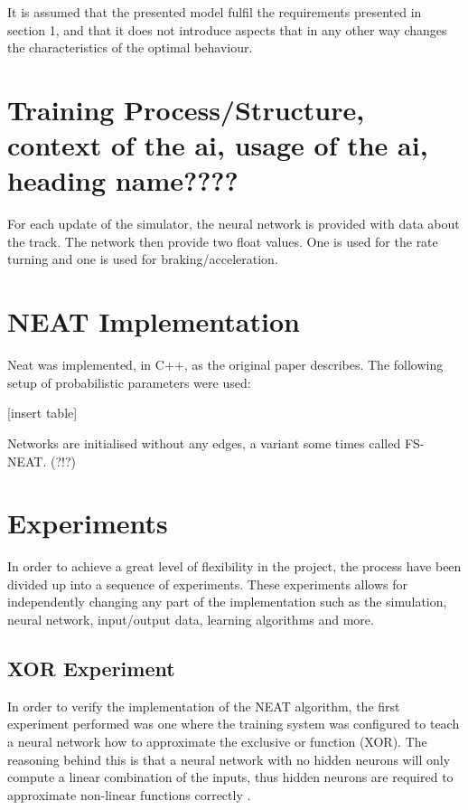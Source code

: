 It is assumed that the presented model fulfil the requirements presented in section 1, and that it does not introduce aspects that in any other way changes the characteristics of the optimal behaviour.

\section{Training Process/Structure, context of the ai, usage of the ai, heading name????}

For each update of the simulator, the neural network is provided with data about the track. The network then provide two float values. One is used for the rate turning and one is used for braking/acceleration.


\section{NEAT Implementation}

Neat was implemented, in C++, as the original paper describes. The following setup of probabilistic parameters were used:

[insert table]

Networks are initialised without any edges, a variant some times called FS-NEAT. (?!?)

\section{Experiments}
In order to achieve a great level of flexibility in the project, the process have been divided up into a sequence of experiments. These experiments allows for independently changing any part of the implementation such as the simulation, neural network, input/output data, learning algorithms and more.

\subsection{XOR Experiment}
In order to verify the implementation of the NEAT algorithm, the first experiment performed was one where the training system was configured to teach a neural network how to approximate the exclusive or function (XOR). The reasoning behind this is that a neural network with no hidden neurons will only compute a linear combination of the inputs, thus hidden neurons are required to approximate non-linear functions correctly \cite{haykin:xor, stanley:neat}.

